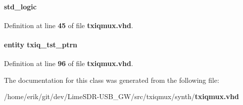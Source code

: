 \paragraph[{test\+\_\+ptrn\+\_\+en\+\_\+sync}]{ {\bfseries \textcolor{comment}{std\+\_\+logic}\textcolor{vhdlchar}{ }} \hspace{0.3cm}{\ttfamily [Signal]}}\label{classtxiqmux_1_1arch_af3001e860692677ec28612c369f30974}


Definition at line {\bf 45} of file {\bf txiqmux.\+vhd}.

\paragraph[{tst\+\_\+ptrn\+\_\+inst0}]{ {\bfseries \textcolor{keywordflow}{entity}\textcolor{vhdlchar}{ }\textcolor{vhdlchar}{txiq\+\_\+tst\+\_\+ptrn}\textcolor{vhdlchar}{ }} \hspace{0.3cm}{\ttfamily [Instantiation]}}\label{classtxiqmux_1_1arch_a5ca4eef86feeef63ca182830c819beb2}


Definition at line {\bf 96} of file {\bf txiqmux.\+vhd}.



The documentation for this class was generated from the following file\+:\begin{DoxyCompactItemize}
\item 
/home/erik/git/dev/\+Lime\+S\+D\+R-\/\+U\+S\+B\+\_\+\+G\+W/src/txiqmux/synth/{\bf txiqmux.\+vhd}\end{DoxyCompactItemize}
